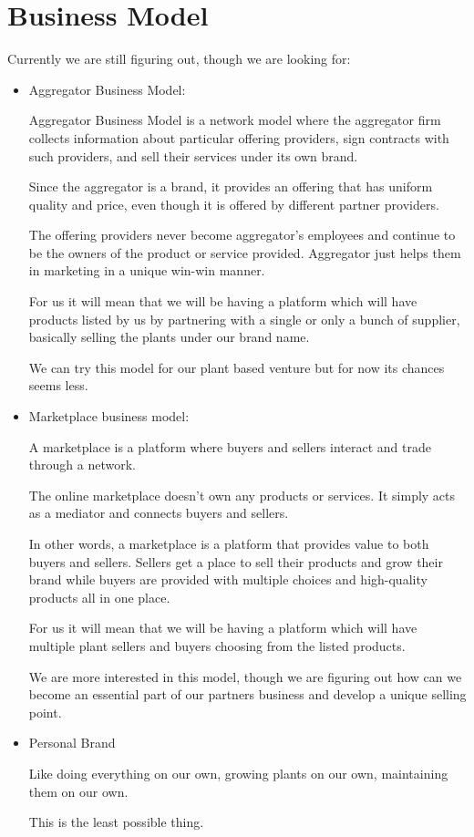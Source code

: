 \documentclass{article}
\begin{document}
\section{Business Model}

Currently we are still figuring out, though we are looking for:

\begin{itemize}

\item Aggregator Business Model:

Aggregator Business Model is a network model where the aggregator firm collects information about particular offering providers, sign contracts with such providers, and sell their services under its own brand.

Since the aggregator is a brand, it provides an offering that has uniform quality and price, even though it is offered by different partner providers.

The offering providers never become aggregator’s employees and continue to be the owners of the product or service provided. Aggregator just helps them in marketing in a unique win-win manner.

For us it will mean that we will be having a platform which will have products listed by us by partnering with a single or only a bunch of supplier, basically selling the plants under our brand name.

We can try this model for our plant based venture but for now its chances seems less.

\item Marketplace business model:

A marketplace is a platform where buyers and sellers interact and trade through a network.

The online marketplace doesn’t own any products or services. It simply acts as a mediator and connects buyers and sellers.

In other words, a marketplace is a platform that provides value to both buyers and sellers. Sellers get a place to sell their products and grow their brand while buyers are provided with multiple choices and high-quality products all in one place.

For us it will mean that we will be having a platform which will have multiple plant sellers and buyers choosing from the listed products.

We are more interested in this model, though we are figuring out how can we become an essential part of our partners business and develop a unique selling point.

\item Personal Brand

Like doing everything on our own, growing plants on our own, maintaining them on our own. 

This is the least possible thing.

\end{itemize}
\end{document}
